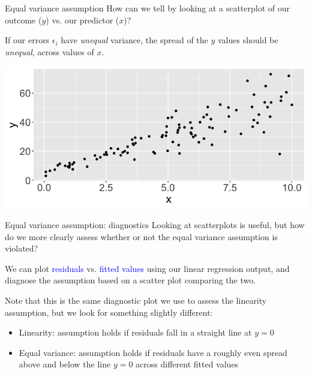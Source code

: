 \documentclass[10pt,t]{beamer}
\begin{document}
\begin{frame}{Equal variance assumption}
How can we tell by looking at a scatterplot of our outcome ($y$) vs. our predictor ($x$)?

\vspace{0.3cm}

If our errors $\epsilon_i$ have \textit{unequal} variance, the spread of the $y$ values should be \textit{unequal}, across values of $x$.

\vspace{0.3cm}
\centering

\includegraphics[scale=0.3]{figures/nonconstvar.png}

\end{frame}

\begin{frame}{Equal variance assumption: diagnostics}
Looking at scatterplots is useful, but how do we more clearly assess whether or not the equal variance assumption is violated?

\vspace{0.3cm}

We can plot \textcolor{blue}{residuals} vs. \textcolor{blue}{fitted values} using our linear regression output, and diagnose the assumption based on a scatter plot comparing the two.

\vspace{0.3cm}

Note that this is the same diagnostic plot we use to assess the linearity assumption, but we look for something slightly different:

\vspace{0.3cm}

\begin{itemize}
	\item Linearity: assumption holds if residuals fall in a straight line at $y = 0$
	\item Equal variance: assumption holds if residuals have a roughly even spread above and below the line $y = 0$ across different fitted values
\end{itemize}

\end{frame}
\end{document}
